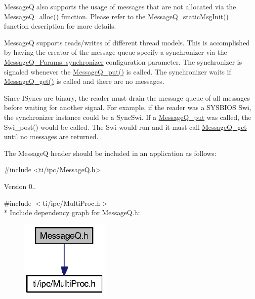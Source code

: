 Message\-Q also supports the usage of messages that are not allocated via the \hyperlink{_message_q_8h_ad8de6381a05a4d8a672d06a3b5676a24}{Message\-Q\-\_\-alloc()} function. Please refer to the \hyperlink{_message_q_8h_a5b627fa66c267f53cccb0a960fe23a64}{Message\-Q\-\_\-static\-Msg\-Init()} function description for more details.

Message\-Q supports reads/writes of different thread models. This is accomplished by having the creator of the message queue specify a synchronizer via the \hyperlink{struct_message_q___params_a6f428033e1aa39162fd51a6d8ade1c9d}{Message\-Q\-\_\-\-Params\-::synchronizer} configuration parameter. The synchronizer is signaled whenever the \hyperlink{_message_q_8h_aa628f9bf897924f61d6adfba3f82fa8d}{Message\-Q\-\_\-put()} is called. The synchronizer waits if \hyperlink{_message_q_8h_aaeb270f6b50d96f1e1dd134591ffc380}{Message\-Q\-\_\-get()} is called and there are no messages.

Since I\-Syncs are binary, the reader must drain the message queue of all messages before waiting for another signal. For example, if the reader was a S\-Y\-S\-B\-I\-O\-S Swi, the synchronizer instance could be a Sync\-Swi. If a \hyperlink{_message_q_8h_aa628f9bf897924f61d6adfba3f82fa8d}{Message\-Q\-\_\-put} was called, the Swi\-\_\-post() would be called. The Swi would run and it must call \hyperlink{_message_q_8h_aaeb270f6b50d96f1e1dd134591ffc380}{Message\-Q\-\_\-get} until no messages are returned.

The Message\-Q header should be included in an application as follows\-: 
\begin{DoxyCode}
\textcolor{preprocessor}{    #include <ti/ipc/MessageQ.h>}
\end{DoxyCode}


\begin{DoxyVersion}{Version}
0.. 


\end{DoxyVersion}
{\ttfamily \#include $<$ti/ipc/\-Multi\-Proc.\-h$>$}\\*
Include dependency graph for Message\-Q.\-h\-:
\nopagebreak
\begin{figure}[H]
\begin{center}
\leavevmode
\includegraphics[width=123pt]{_message_q_8h__incl}
\end{center}
\end{figure}

